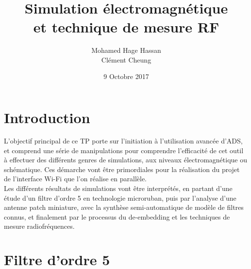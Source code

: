 \documentclass[a4paper]{article}
\begin{document}
\newcommand\textstyleEmphasis[1]{\textit{#1}}
\renewcommand{\contentsname}{Table des mati\`eres}
\renewcommand\refname{R\'ef\'erences}

\renewcommand{\abstractname}{Pr\'eambule}
\title{\textbf{Simulation \'electromagn\'etique \\ et technique de mesure RF}}
\author{Mohamed Hage Hassan \\ Cl\'ement Cheung}
\date{9 Octobre 2017}
\maketitle
\thispagestyle{empty}

\tableofcontents
\clearpage

\section{Introduction}
L'objectif principal de ce TP porte sur l'initiation \`a l'utilisation avanc\'ee d'ADS, et comprend une s\'erie de
 manipulations pour comprendre l'efficacit\'e de cet outil \`a effectuer des diff\'erents genres de simulations,
 aux niveaux \'electromagn\'etique ou sch\'ematique. Ces d\'emarche vont \^etre primordiales pour la r\'ealisation du projet
 de l'interface Wi-Fi que l'on r\'ealise en parall\`ele.\\


Les diff\'erents r\'esultats de simulations vont \^etre interpr\'et\'es, en partant d'une \'etude d'un filtre d'ordre 5
en technologie microruban, puis par l'analyse d'une antenne patch miniature, avec la synth\`ese semi-automatique de
mod\`ele de filtres connus, et finalement par le processus du de-embedding et les techniques de mesure radiofr\'equences.

\section{Filtre d'ordre 5}
\end{document}
